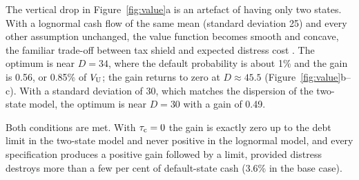 The vertical drop in Figure~\ref{fig:value}a is an artefact of having only two states. With a lognormal cash flow of the same mean (standard deviation 25) and every other assumption unchanged, the value function becomes smooth and concave, the familiar trade-off between tax shield and expected distress cost \citep{kraus1973}. The optimum is near $D = 34$, where the default probability is about 1\% and the gain is 0.56, or 0.85\% of $V_{\mathrm{U}}$; the gain returns to zero at $D \approx 45.5$ (Figure~\ref{fig:value}b--c). With a standard deviation of 30, which matches the dispersion of the two-state model, the optimum is near $D = 30$ with a gain of 0.49.

Both conditions are met. With $\tau_{\mathrm{c}} = 0$ the gain is exactly zero up to the debt limit in the two-state model and never positive in the lognormal model, and every specification produces a positive gain followed by a limit, provided distress destroys more than a few per cent of default-state cash (3.6\% in the base case).
